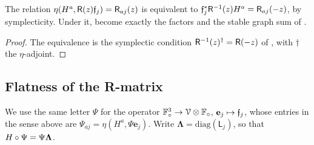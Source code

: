 \begin{lem}[Dictionary]
\label{lem:gen-dict}
The relation $\eta(H^a,\mathsf{R}(z)\mathfrak{f}_j)=\mathsf{R}_{aj}(z)$ is equivalent to $\mathfrak{f}_j^*\mathsf{R}^{-1}(z)H^a=\mathsf{R}_{aj}(-z)$, by symplecticity. Under it, \cite[Defs.~2.2, 2.13]{PPZ15} become exactly the factors and the stable graph sum of \cite{BS}. 
\end{lem}
\begin{proof}
The equivalence is the symplectic condition $\mathsf{R}^{-1}(z)^{\dagger}=\mathsf{R}(-z)$ of \cite[(5)]{PPZ15}, with $\dagger$ the $\eta$-adjoint.
\end{proof}

\subsection{Flatness of the R-matrix}

We use the same letter $\Psi$ for the operator $\mathbb{F}_{\circ}^3\to\mathcal{V}\otimes\mathbb{F}_{\circ}$, $\mathbf{e}_j\mapsto\mathfrak{f}_j$, whose entries in the sense above are $\Psi_{aj}=\eta(H^a,\Psi\mathbf{e}_j)$. Write $\mathbf{\Lambda}=\mathrm{diag}(\mathsf{L}_j)$, so that $H\circ\Psi=\Psi\mathbf{\Lambda}$.

